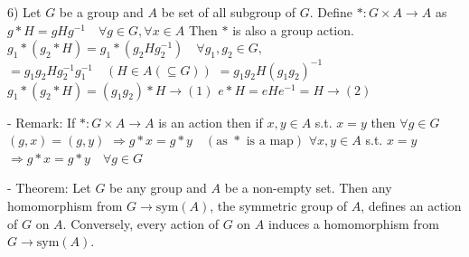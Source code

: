 6) Let $G$ be a group and $A$ be set of all subgroup of $G$. Define
$*: G \times A \to A$ as
$g * H = gHg^{-1} \quad \forall g \in G, \forall x \in A$
Then $*$ is also a group action.
$g_1 * (g_2 * H) = g_1 * (g_2 H g_2^{-1}) \quad \forall g_1, g_2 \in G,$
$= g_1 g_2 H g_2^{-1} g_1^{-1} \quad (H \in A (\subseteq G))$
$= g_1 g_2 H (g_1 g_2)^{-1}$
$g_1 * (g_2 * H) = (g_1 g_2) * H \longrightarrow (1)$
$e * H = e H e^{-1} = H \longrightarrow (2)$

- Remark: If $*: G \times A \to A$ is an action then
if $x, y \in A$ s.t. $x = y$
then $\forall g \in G$
$(g, x) = (g, y)$
$\Rightarrow g * x = g * y \quad (\text{as } * \text{ is a map})$
$\forall x, y \in A$ s.t.
$x = y$
$\Rightarrow g * x = g * y \quad \forall g \in G$

- Theorem: Let $G$ be any group and $A$ be a non-empty set. Then any homomorphism from $G \to \text{sym}(A)$, the symmetric group of $A$, defines an action of $G$ on $A$.
Conversely, every action of $G$ on $A$ induces a homomorphism from $G \to \text{sym}(A)$.
